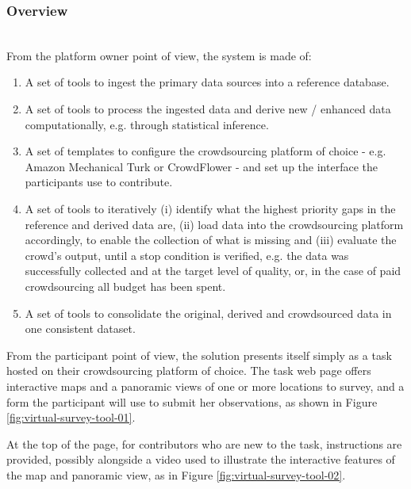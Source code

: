 \subsubsection{Overview} \leavevmode \\ %

From the platform owner point of view, the system is made of:

\begin{enumerate}
    \item A set of tools to ingest the primary data sources into a reference database.
    \item A set of tools to process the ingested data and derive new / enhanced data computationally, e.g. through statistical inference.
    \item A set of templates to configure the crowdsourcing platform of choice - e.g. Amazon Mechanical Turk or CrowdFlower - and set up the interface the participants use to contribute.
    \item A set of tools to iteratively (i) identify what the highest priority gaps in the reference and derived data are, (ii) load data into the crowdsourcing platform accordingly, to enable the collection of what is missing and (iii) evaluate the crowd's output, until a stop condition is verified, e.g. the data was successfully collected and at the target level of quality, or, in the case of paid crowdsourcing all budget has been spent.
    \item A set of tools to consolidate the original, derived and crowdsourced data in one consistent dataset.
\end{enumerate}

From the participant point of view, the solution presents itself simply as a task hosted on their crowdsourcing platform of choice. The task web page offers interactive maps and a panoramic views of one or more locations to survey, and a form the participant will use to submit her observations, as shown in Figure \ref{fig:virtual-survey-tool-01}. 

At the top of the page, for contributors who are new to the task, instructions are provided, possibly alongside a video used to illustrate the interactive features of the map and panoramic view, as in Figure \ref{fig:virtual-survey-tool-02}.

\begin{figure}[!ht]
    \begin{floatrow}
    \end{floatrow}
\end{figure}

